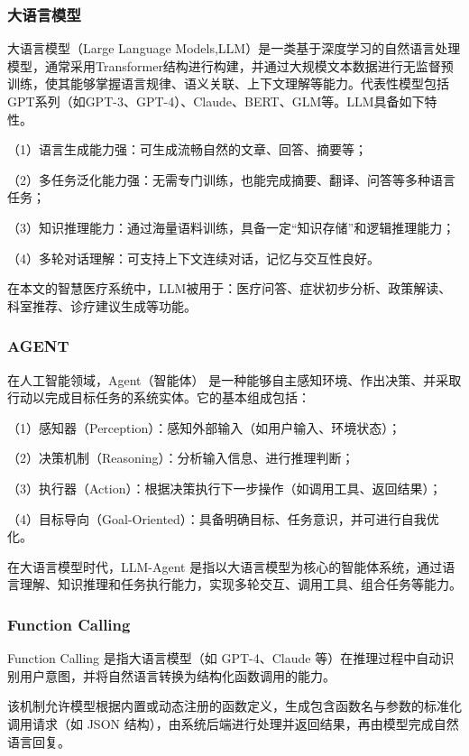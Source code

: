 \documentclass[fleqn,10pt]{IntroToAI} %
\begin{document}
\subsubsection{大语言模型}

大语言模型（Large Language Models,LLM）是一类基于深度学习的自然语言处理模型，通常采用Transformer结构进行构建，并通过大规模文本数据进行无监督预训练，使其能够掌握语言规律、语义关联、上下文理解等能力。代表性模型包括GPT系列（如GPT-3、GPT-4）、Claude、BERT、GLM等。LLM具备如下特性。

（1）语言生成能力强：可生成流畅自然的文章、回答、摘要等；

（2）多任务泛化能力强：无需专门训练，也能完成摘要、翻译、问答等多种语言任务；

（3）知识推理能力：通过海量语料训练，具备一定“知识存储”和逻辑推理能力；

（4）多轮对话理解：可支持上下文连续对话，记忆与交互性良好。

在本文的智慧医疗系统中，LLM被用于：医疗问答、症状初步分析、政策解读、科室推荐、诊疗建议生成等功能。

\subsubsection{AGENT}

在人工智能领域，Agent（智能体） 是一种能够自主感知环境、作出决策、并采取行动以完成目标任务的系统实体。它的基本组成包括：

（1）感知器（Perception）：感知外部输入（如用户输入、环境状态）；

（2）决策机制（Reasoning）：分析输入信息、进行推理判断；

（3）执行器（Action）：根据决策执行下一步操作（如调用工具、返回结果）；

（4）目标导向（Goal-Oriented）：具备明确目标、任务意识，并可进行自我优化。

在大语言模型时代，LLM-Agent 是指以大语言模型为核心的智能体系统，通过语言理解、知识推理和任务执行能力，实现多轮交互、调用工具、组合任务等能力。


\subsubsection{Function Calling }
Function Calling 是指大语言模型（如 GPT-4、Claude 等）在推理过程中自动识别用户意图，并将自然语言转换为结构化函数调用的能力。

该机制允许模型根据内置或动态注册的函数定义，生成包含函数名与参数的标准化调用请求（如 JSON 结构），由系统后端进行处理并返回结果，再由模型完成自然语言回复。
\end{document}
